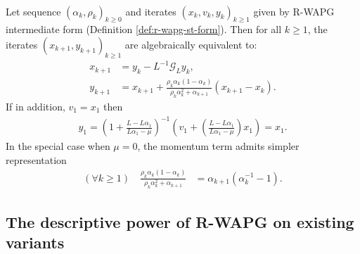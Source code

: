 \documentclass[12pt]{article}
\begin{document}
        \begin{proposition}\label{prop:r-wapg-momentum-repr}
            \;\\
            Let sequence $(\alpha_k, \rho_k)_{k \ge 0}$ and iterates $(x_k, v_k, y_k)_{k\ge 1}$ given by R-WAPG intermediate form (Definition \ref{def:r-wapg-st-form}). 
            Then for all $k \ge 1$, the iterates $(x_{k + 1}, y_{k + 1})_{k \ge 1}$ are algebraically equivalent to: 
            \begin{align*}
                x_{k + 1} &= y_k - L^{-1}\mathcal G_Ly_k, 
                \\
                y_{k + 1} &= 
                x_{k + 1} + 
                \frac{\rho_k\alpha_k(1 - \alpha_k)}
                {\rho_k\alpha_k^2 + \alpha_{k + 1}}(x_{k + 1} - x_k). 
            \end{align*}
            If in addition, $v_1 = x_1$ then 
            \begin{align*}
                y_1 = \left(
                    1 + \frac{L - L \alpha_1}{L\alpha_1 - \mu}
                \right)^{-1}\left(
                    v_1 + \left(
                        \frac{L - L \alpha_1}{L \alpha_1 - \mu}
                    \right)x_1
                \right) = x_1. 
            \end{align*}
            In the special case when $\mu = 0$, the momentum term admits simpler representation 
            \begin{align*}
                (\forall k \ge 1) \quad 
                \frac{\rho_k\alpha_k(1 - \alpha_k)}{\rho_k\alpha_k^2 + \alpha_{k + 1}}
                & = \alpha_{k + 1}(\alpha_k^{-1} - 1). 
            \end{align*}
        \end{proposition}


    \subsection{The descriptive power of R-WAPG on existing variants}
\end{document}
